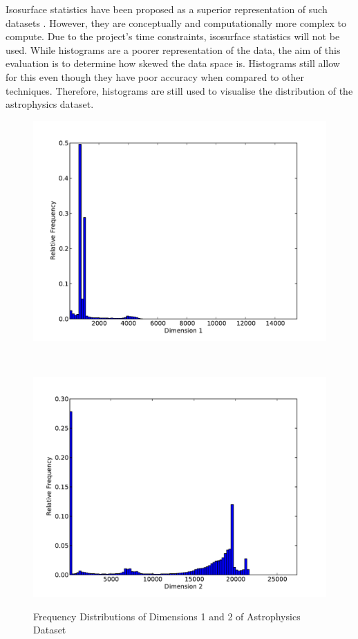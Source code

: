 Isosurface statistics have been proposed as a superior representation of such datasets \cite{histograms-and-isosurfaces}. However, they are conceptually and computationally more complex to compute. Due to the project's time constraints, isosurface statistics will not be used. While histograms are a poorer representation of the data, the aim of this evaluation is to determine how skewed the data space is. Histograms still allow for this even though they have poor accuracy when compared to other techniques. Therefore, histograms are still used to visualise the distribution of the astrophysics dataset.

\begin{figure}
	\begin{center}
		\begin{subfloat}{%
			\includegraphics[scale=0.36]{figures/histograms/astrophysics_500000_0.pdf}
		}
		\end{subfloat}~
		\begin{subfloat}{%
			\includegraphics[scale=0.36]{figures/histograms/astrophysics_500000_1.pdf}
		}
		\end{subfloat}
	\end{center}

	\caption{Frequency Distributions of Dimensions 1 and 2 of Astrophysics Dataset}
	\label{fig:astrophysics-histograms1}
\end{figure}
